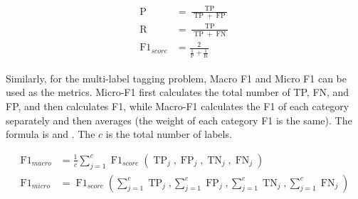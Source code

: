 \begin{align}\label{fml:f1score}
    \begin{split}
        \operatorname{P}          & =\frac{\operatorname{TP}}{\operatorname{TP}+\operatorname{FP}}    \\
        \operatorname{R}          & =\frac{\operatorname{TP}}{\operatorname{TP}+\operatorname{FN}}    \\
        \operatorname{F1}_{score} & = \frac{2}{\frac{1}{\operatorname{P}}+\frac{1}{\operatorname{R}}}
    \end{split}
\end{align}


Similarly, for the multi-label tagging problem, Macro F1 and Micro F1 can be used as the metrics. Micro-F1 first calculates the total number of TP, FN, and FP, and then calculates F1, while Macro-F1 calculates the F1 of each category separately and then averages (the weight of each category F1 is the same). The formula is \eqname{\ref{fml:f1-macro}} and \eqname{\ref{fml:f1-micro}}. The \(c\) is the total number of labels.

\begin{align}
    \operatorname{F1}_{macro} & =\frac{1}{c} \sum_{j=1}^{c} \operatorname{F1}_{score}(\operatorname{TP}_{j}, \operatorname{FP}_{j}, \operatorname{TN}_{j}, \operatorname{FN}_{j}) \label{fml:f1-macro}                                  \\
    \operatorname{F1}_{micro} & =\operatorname{F1}_{score}(\sum_{j=1}^{c} \operatorname{TP}_{j}, \sum_{j=1}^{c} \operatorname{FP}_{j}, \sum_{j=1}^{c} \operatorname{TN}_{j}, \sum_{j=1}^{c} \operatorname{FN}_{j}) \label{fml:f1-micro}
\end{align}


